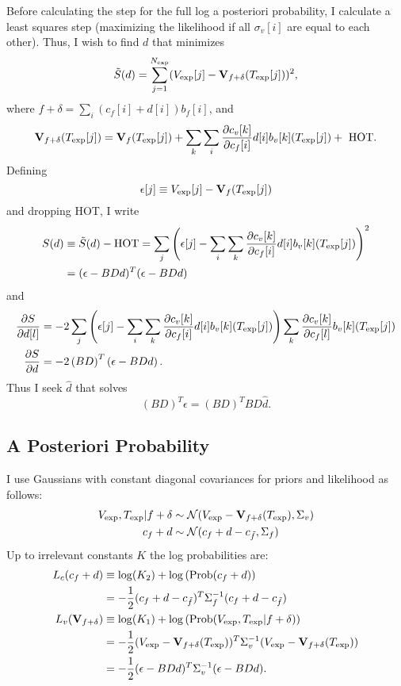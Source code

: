 \documentclass[11pt]{article}
\newcommand{\normal}[2]{{\cal N}(#1,#2)}
\newcommand{\normalexp}[3]{ -\frac{1}{2}
      (#1 - #2)^T #3^{-1} (#1 - #2) }
\newcommand{\fnom}{\tilde f}
\newcommand{\Prob}{\text{Prob}}
\newcommand{\partiald}[2]{\frac{\partial #1}{\partial #2}}
\newcommand\Vt{\mathbf{V}}
\newcommand\vexp{V_{\rm{exp}}}
\newcommand\texp{T_{\rm{exp}}}
\newcommand\cf{c_f}
\newcommand\cv{c_v}
\newcommand\fbasis{b_f}
\newcommand\vbasis{b_v}
\begin{document}
Before calculating the step for the full log a posteriori probability,
I calculate a least squares step (maximizing the likelihood if all
$\sigma_v[i]$ are equal to each other).  Thus, I wish to find $d$ that
minimizes
\begin{equation}
  \label{eq:ssq}
  \tilde S(d) = \sum_{j=1}^{N_{\rm exp}} (\vexp[j] - \Vt_{f+\delta}(\texp[j]))^2,
\end{equation}
where $f+\delta = \sum_i (\cf[i] + d[i])\fbasis[i]$, and 
\begin{equation}
  \label{eq:taylor}
  \Vt_{f+\delta}(\texp[j]) = \Vt_f(\texp[j]) +
  \sum_k \sum_i \partiald{\cv[k]}{\cf[i]}d[i]\vbasis[k](\texp[j])
  +\text{ HOT}.
\end{equation}
Defining
\begin{equation}
  \label{eq:epsilon}
  \epsilon[j] \equiv \vexp[j] - \Vt_f(\texp[j])
\end{equation}
and dropping HOT, I write
\begin{align}
  S(d) &\equiv \tilde S(d) - \text{HOT} = \sum_j \left( \epsilon[j] -
  \sum_i \sum_k \partiald{\cv[k]}{\cf[i]}d[i]\vbasis[k](\texp[j])
  \right)^2 \nonumber \\
  \label{eq:sd}
  &= (\epsilon - BDd)^T(\epsilon - BDd)
\end{align}
and
\begin{align*}
  \partiald{S}{d[l]} &= -2 \sum_j \left( \epsilon[j] -
  \sum_i \sum_k \partiald{\cv[k]}{\cf[i]}d[i]\vbasis[k](\texp[j])
  \right)
  \sum_k \partiald{\cv[k]}{\cf[l]}\vbasis[k](\texp[j])\\
  \partiald{S}{d} &= -2\left(BD\right)^T\left(\epsilon - BDd\right).
\end{align*}
Thus I seek $\hat d$ that solves
\begin{equation}
  \label{eq:dhat}
  \left(BD\right)^T\epsilon = \left(BD\right)^T BD \hat d.
\end{equation}

\subsection{A Posteriori Probability}
\label{sec:app}

I use Gaussians with constant diagonal covariances for priors and
likelihood as follows:
\begin{align}
\vexp,\texp | f+\delta &\sim
\normal{\vexp-\Vt_{f+\delta}(\texp)}{\Sigma_v} \\
\cf+d &\sim \normal{\cf+d - c_{\fnom}}{\Sigma_f}
\end{align}
Up to irrelevant constants $K$ the log probabilities are:
\begin{align}
  L_c(\cf+d) & \equiv \log(K_2) + \log \left(\Prob(\cf+d) \right)\\
  & = \normalexp{\cf+d}{c_{\fnom}}{\Sigma_f}\\
  L_v(\Vt_{f+\delta}) & \equiv \log(K_1) + \log
  \left(\Prob(\vexp,\texp | f+\delta) \right)
  \nonumber \\
  & = \normalexp{\vexp}{\Vt_{f+\delta}(\texp)}{\Sigma_v} \\
  &= \normalexp{\epsilon}{BDd}{\Sigma_v}.
\end{align}
\end{document}
